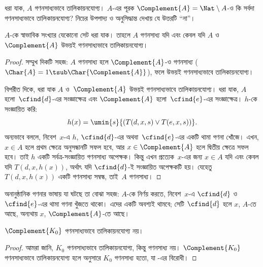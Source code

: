 \documentclass[../../../include/open-logic-section]{subfiles}
\begin{document}

ধরা যাক, $A$ গণনসাধ্যভাবে তালিকায়নযোগ্য। $A$-এর পূরক
$\Complement{A} = \Nat \setminus A$-ও কি সর্বদা গণনসাধ্যভাবে
তালিকায়নযোগ্য? নিচের উপপাদ্য ও অনুসিদ্ধান্ত দেখায় যে উত্তরটি “না”।

\begin{thm}
$A$-কে স্বাভাবিক সংখ্যার যেকোনো সেট ধরা যাক। তাহলে $A$ গণনসাধ্য যদি
এবং কেবল যদি $A$ ও $\Complement{A}$ উভয়ই গণনসাধ্যভাবে তালিকায়নযোগ্য।
\end{thm}

\begin{proof}
সম্মুখ দিকটি সহজ: $A$ গণনসাধ্য হলে $\Complement{A}$-ও গণনসাধ্য
($\Char{A} = 1 \tsub \Char{\Complement{A}}$), ফলে উভয়ই গণনসাধ্যভাবে
তালিকায়নযোগ্য।

বিপরীত দিকে, ধরা যাক $A$ ও~$\Complement{A}$ উভয়ই গণনসাধ্যভাবে
তালিকায়নযোগ্য। ধরা যাক, $A$ হলো~$\cfind{d}$-এর সংজ্ঞাক্ষেত্র এবং
$\Complement{A}$ হলো~$\cfind{e}$-এর সংজ্ঞাক্ষেত্র। $h$-কে সংজ্ঞায়িত করি:
\[
h(x) = \umin{s}{(T(d,x,s) \lor T(e,x,s))}.
\]
অন্যভাবে বললে, নিবেশ~$x$-এ $h$, $\cfind{d}$-এর অথবা~$\cfind{e}$-এর
একটি থামা গণনা খোঁজে। এখন, $x \in A$ হলে প্রথম ক্ষেত্রে অনুসন্ধানটি
সফল হবে, আর $x \in \Complement{A}$ হলে দ্বিতীয় ক্ষেত্রে সফল হবে। তাই
$h$ একটি সর্বত্র-সংজ্ঞায়িত গণনসাধ্য অপেক্ষক। কিন্তু এখন প্রত্যেক~$x$-এর
জন্য $x \in A$ যদি এবং কেবল যদি $T(d, x, h(x))$, অর্থাৎ যদি
$\cfind{d}$-ই সংজ্ঞায়িত অপেক্ষকটি হয়। যেহেতু $T(d, x, h(x))$ একটি
গণনসাধ্য সম্বন্ধ, তাই~$A$ গণনসাধ্য।
\end{proof}

\begin{explain}
অনানুষ্ঠানিক গণনার ভাষায় যা ঘটছে তা বোঝা সহজ: $A$-কে নির্ণয় করতে,
নিবেশ~$x$-এ $\cfind{d}$ ও $\cfind{e}$-এর থামা গণনা খুঁজতে থাকো। এদের
একটি অবশ্যই থামবে; সেটি $\cfind{d}$ হলে $x$, $A$-তে আছে, অন্যথায়
$x$, $\Complement{A}$-তে আছে।
\end{explain}

\begin{cor}
$\Complement{K_0}$ গণনসাধ্যভাবে তালিকায়নযোগ্য নয়।
\end{cor}

\begin{proof}
আমরা জানি, $K_0$ গণনসাধ্যভাবে তালিকায়নযোগ্য, কিন্তু গণনসাধ্য নয়।
$\Complement{K_0}$ গণনসাধ্যভাবে তালিকায়নযোগ্য হলে
 অনুসারে $K_0$ গণনসাধ্য হতো, যা
-এর বিরোধী।
\end{proof}
\end{document}
